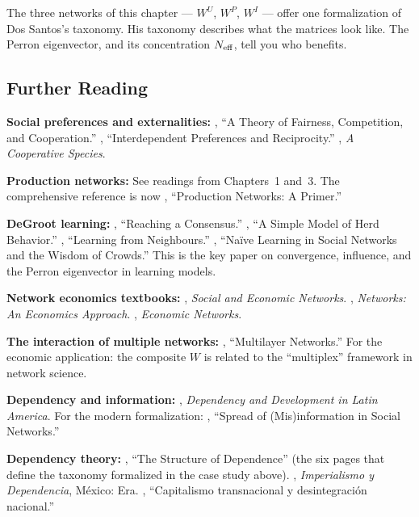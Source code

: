 \documentclass[../structural_economics_book.tex]{subfiles}
\begin{document}
The three networks of this chapter --- $W^U$, $W^P$, $W^I$ --- offer one formalization of Dos Santos's taxonomy. His taxonomy describes what the matrices look like. The Perron eigenvector, and its concentration $N_{\text{eff}}$, tell you who benefits.


\subsection*{Further Reading}

\textbf{Social preferences and externalities:} \citet{fehr1999theory}, ``A Theory of Fairness, Competition, and Cooperation.'' \citet{sobel2005interdependent}, ``Interdependent Preferences and Reciprocity.'' \citet{bowles2011cooperative}, \textit{A Cooperative Species}.

\textbf{Production networks:} See readings from Chapters~1 and~3. The comprehensive reference is now \citet{carvalho2019production}, ``Production Networks: A Primer.''

\textbf{DeGroot learning:} \citet{degroot1974reaching}, ``Reaching a Consensus.'' \citet{banerjee1992simple}, ``A Simple Model of Herd Behavior.'' \citet{bala1998learning}, ``Learning from Neighbours.'' \citet{golub2010naive}, ``Na\"{i}ve Learning in Social Networks and the Wisdom of Crowds.'' This is the key paper on convergence, influence, and the Perron eigenvector in learning models.

\textbf{Network economics textbooks:} \citet{jackson2008social}, \textit{Social and Economic Networks}. \citet{goyal2023networks}, \textit{Networks: An Economics Approach}. \citet{sargent2024economic}, \textit{Economic Networks}.

\textbf{The interaction of multiple networks:} \citet{kivela2014multilayer}, ``Multilayer Networks.'' For the economic application: the composite $W$ is related to the ``multiplex'' framework in network science.

\textbf{Dependency and information:} \citet{cardoso1979dependency}, \textit{Dependency and Development in Latin America}. For the modern formalization: \citet{acemoglu2010spread}, ``Spread of (Mis)information in Social Networks.''

\textbf{Dependency theory:} \citet{dossantos1970structure}, ``The Structure of Dependence'' (the six pages that define the taxonomy formalized in the case study above). \citet{dossantos1978imperialismo}, \textit{Imperialismo y Dependencia}, M\'{e}xico: Era. \citet{sunkel1971capitalismo}, ``Capitalismo transnacional y desintegraci\'{o}n nacional.''
\end{document}
